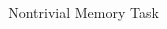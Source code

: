 \documentclass{beamer}
\begin{document}
\begin{frame}[t]
\begin{columns}[t]
\begin{column}{.4\textwidth}
\end{column}



\begin{column}{.55\textwidth}

\vspace{-8pt}
\begin{myblock}{Nontrivial Memory Task}
	

\end{myblock}
\end{column}
\end{columns}
\end{frame}
\end{document}
